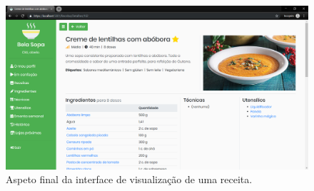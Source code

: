 \begin{landscape}
\begin{figure}[p]
  \centering
  \includegraphics[height=.85\textheight]{figures/11/final-4.png}
  \caption{Aspeto final da interface de visualização de uma receita.}
  \label{fig:construcao:final-4}
\end{figure}

\end{landscape}

